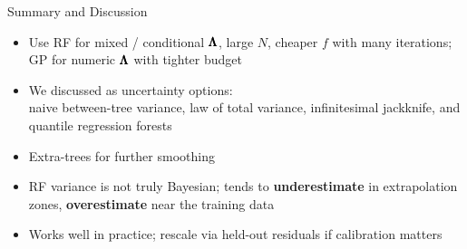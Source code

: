 \documentclass[main]{subfiles}
\begin{document}
\begin{frame}[t]{Summary and Discussion}
\begin{itemize}
  \item Use RF for mixed / conditional $\pmb{\Lambda}$, large $N$, cheaper $f$ with many iterations;
  GP for numeric $\pmb{\Lambda}$ with tighter budget
  \item We discussed as uncertainty options:\\
  naive between-tree variance, law of total variance, infinitesimal jackknife, and quantile regression forests
  \item Extra-trees for further smoothing
  \item RF variance is not truly Bayesian; tends to \textbf{underestimate} in extrapolation zones, \textbf{overestimate} near the training data
  \item Works well in practice; rescale via held-out residuals if calibration matters
\end{itemize}
\end{frame}
\end{document}
